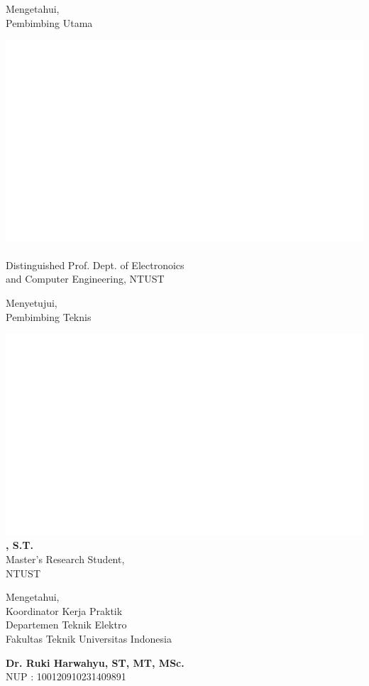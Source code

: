 \noindent %
\begin{minipage}[t]{0.5\textwidth}
    \centering
    Mengetahui, \\
    Pembimbing Utama
    
    \vspace{0.25cm}\includegraphics[width=0.5\linewidth]{assets/trans.png}\\[0.25cm]

    
    \textbf{\pembimbingUtama} \\
    Distinguished Prof. Dept. of Electronoics \\
    and Computer Engineering, NTUST
\end{minipage}%
\begin{minipage}[t]{0.5\textwidth}
    \centering
    Menyetujui, \\
    Pembimbing Teknis
    
    \vspace{0.25cm}\includegraphics[width=0.5\linewidth]{assets/trans.png}\\[0.25cm]
    
    \textbf{\pembimbingHarian, S.T.} \\
    Master's Research Student, \\
    NTUST
\end{minipage}

\vspace{1cm} %

\begin{center}
    Mengetahui, \\
    Koordinator Kerja Praktik \\
    Departemen Teknik Elektro \\
    Fakultas Teknik Universitas Indonesia
    
    \vspace{2cm} 
    
    \textbf{Dr. Ruki Harwahyu, ST, MT, MSc.} \\
    NUP : 100120910231409891
\end{center}

\vfill 
